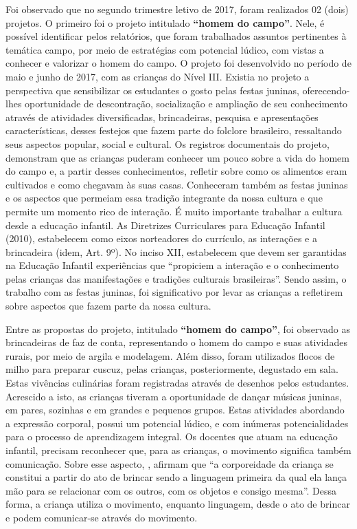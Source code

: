 \begin{refsection}
    Foi observado que no segundo trimestre letivo de 2017, foram realizados 02 (dois) projetos. O primeiro foi o projeto intitulado \textbf{“homem do campo”}. Nele, é possível identificar pelos relatórios, que foram trabalhados assuntos pertinentes à temática campo, por meio de estratégias com potencial lúdico, com vistas a conhecer e valorizar o homem do campo. O projeto foi desenvolvido no período de maio e junho de 2017, com as crianças do Nível III. Existia no projeto a perspectiva que sensibilizar os estudantes o gosto pelas festas juninas, oferecendo-lhes oportunidade de descontração, socialização e ampliação de seu conhecimento através de atividades diversificadas, brincadeiras, pesquisa e apresentações características, desses festejos que fazem parte do folclore brasileiro, ressaltando seus aspectos popular, social e cultural. Os registros documentais do projeto, demonstram que as crianças puderam conhecer um pouco sobre a vida do homem do campo e, a partir desses conhecimentos, refletir sobre como os alimentos eram cultivados e como chegavam às suas casas. Conheceram também as festas juninas e os aspectos que permeiam essa tradição integrante da nossa cultura e que permite um momento rico de interação. É muito importante trabalhar a cultura desde a educação infantil. As Diretrizes Curriculares para Educação Infantil (2010), estabelecem como eixos norteadores do currículo, as interações e a brincadeira (idem, Art. 9º). No inciso XII, estabelecem que devem ser garantidas na Educação Infantil experiências que “propiciem a interação e o conhecimento pelas crianças das manifestações e tradições culturais brasileiras”. Sendo assim, o trabalho com as festas juninas, foi significativo por levar as crianças a refletirem sobre aspectos que fazem parte da nossa cultura.   

    Entre as propostas do projeto, intitulado \textbf{“homem do campo”}, foi observado as brincadeiras de faz de conta, representando o homem do campo e suas atividades rurais, por meio de argila e modelagem. Além disso, foram utilizados flocos de milho para preparar cuscuz, pelas crianças, posteriormente, degustado em sala. Estas vivências culinárias foram registradas através de desenhos pelos estudantes. Acrescido a isto, as crianças tiveram a oportunidade de dançar músicas juninas, em pares, sozinhas e em grandes e pequenos grupos. Estas atividades abordando a expressão corporal, possui um potencial lúdico, e com inúmeras potencialidades para o processo de aprendizagem integral. Os docentes que atuam na educação infantil, precisam reconhecer que, para as crianças, o movimento significa também comunicação. Sobre esse aspecto, \textcite[p.~1]{KUHNEAndSILVA2006corpos}, afirmam que “a corporeidade da criança se constitui a partir do ato de brincar sendo a linguagem primeira da qual ela lança mão para se relacionar com os outros, com os objetos e consigo mesma”. Dessa forma, a criança utiliza o movimento, enquanto linguagem, desde o ato de brincar e podem comunicar-se através do movimento.  


\end{refsection}
